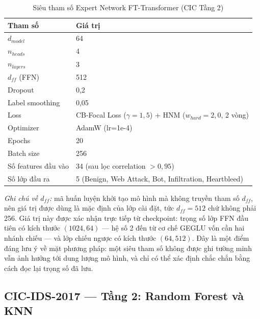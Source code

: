 \documentclass[../DoAn.tex]{subfiles}
\begin{document}
\begin{table}[H]
    \centering
    \caption{Siêu tham số Expert Network FT-Transformer (CIC Tầng 2)}
    \label{tab:hyp-expert}
    \begin{tabular}{ll}
        \hline
        \textbf{Tham số} & \textbf{Giá trị} \\
        \hline
        $d_{model}$ & 64 \\
        $n_{heads}$ & 4 \\
        $n_{layers}$ & 3 \\
        $d_{ff}$ (FFN) & 512 \\
        Dropout & 0,2 \\
        Label smoothing & 0,05 \\
        Loss & CB-Focal Loss ($\gamma=1{,}5$) + HNM ($w_{hard}=2{,}0$, 2 vòng) \\
        Optimizer & AdamW (lr=1e-4) \\
        Epochs & 20 \\
        Batch size & 256 \\
        Số features đầu vào & 34 (sau lọc correlation $> 0{,}95$) \\
        Số lớp đầu ra & 5 (Benign, Web Attack, Bot, Infiltration, Heartbleed) \\
        \hline
    \end{tabular}
\end{table}

\textit{Ghi chú về $d_{ff}$:} mã huấn luyện khởi tạo mô hình mà không truyền tham số $d_{ff}$, nên giá trị được dùng là mặc định của lớp cài đặt, tức $d_{ff}=512$ chứ không phải 256. Giá trị này được xác nhận trực tiếp từ checkpoint: trọng số lớp FFN đầu tiên có kích thước $(1024, 64)$ --- hệ số 2 đến từ cơ chế GEGLU vốn cần hai nhánh chiếu --- và lớp chiếu ngược có kích thước $(64, 512)$. Đây là một điểm đáng lưu ý về mặt phương pháp: một siêu tham số không được ghi tường minh vẫn ảnh hưởng tới dung lượng mô hình, và chỉ có thể xác định chắc chắn bằng cách đọc lại trọng số đã lưu.

\subsection{CIC-IDS-2017 --- Tầng 2: Random Forest và KNN}
\end{document}
